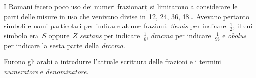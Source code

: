 
I Romani fecero poco uso dei numeri frazionari; si limitarono a considerare
le parti delle misure in uso che venivano divise in~12, 24, 36, 48\ldots 
Avevano pertanto simboli e nomi particolari per indicare alcune frazioni. 
\emph{Semis} per indicare~\(\frac{1}{2}\), il cui simbolo era~\(S\) 
oppure~\(Z\) 
\emph{sextans} per indicare~\(\frac{1}{6}\), \emph{dracma} per 
indicare~\(\frac{1}{96}\) e \emph{obolus} per indicare la sesta parte della 
\emph{dracma}.

Furono gli arabi a introdurre l'attuale scrittura delle
frazioni e i termini \emph{numeratore} e \emph{denominatore}.

